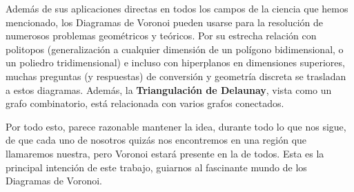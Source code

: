  Además de sus aplicaciones directas en todos los campos de la ciencia que hemos mencionado, los Diagramas de Voronoi pueden usarse para la resolución de numerosos problemas geométricos y teóricos. Por su estrecha relación con politopos (generalización a cualquier dimensión de un polígono bidimensional, o un poliedro tridimensional) e incluso con hiperplanos en dimensiones superiores, muchas preguntas (y respuestas) de conversión y geometría discreta se trasladan a estos diagramas. Además, la \textbf{Triangulación de Delaunay}, vista como un grafo combinatorio, está relacionada con varios grafos conectados.
 
 Por todo esto, parece razonable mantener la idea, durante todo lo que nos sigue, de que cada uno de nosotros quizás nos encontremos en una región que llamaremos nuestra, pero Voronoi estará presente en la de todos. Esta es la  principal intención de este trabajo, guiarnos al fascinante mundo de los Diagramas de Voronoi.
 
 